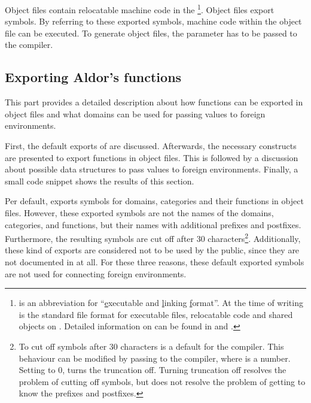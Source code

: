 Object files contain relocatable machine code in the \ELF\footnote{\ELF is an abbreviation for ``{\underline e}xecutable and {\underline l}inking {\underline f}ormat''. At the time of writing \LibCharSet \ELF is the standard file format for executable files, relocatable code and shared objects on \GNULinux. Detailed information on \ELF can be found in \cite{ELF1995} and \cite{SystemV2003}.}. Object files export symbols. By referring to these exported symbols, machine code within the object file can be executed. To generate object files, the parameter  has to be passed to the \Aldor compiler.




\subsection{Exporting Aldor's functions}

This part provides a detailed description about how \Aldor functions can be exported in object files and what domains can be used for passing values to foreign environments.

First, the default exports of \Aldor are discussed. Afterwards, the necessary \Aldor constructs are presented to export \Aldor functions in object files. This is followed by a discussion about possible data structures to pass \Aldor values to foreign environments. Finally, a small code snippet shows the results of this section.

Per default, \Aldor exports symbols for domains, categories and their functions in object files. However, these exported symbols are not the names of the domains, categories, and functions, but their names with additional prefixes and postfixes. Furthermore, the resulting symbols are cut off after 30 characters\footnote{To cut off symbols after $30$ characters is a default for the \Aldor compiler. This behaviour can be modified by passing  to the \Aldor compiler, where  is a number. Setting  to $0$, turns the truncation off. Turning truncation off resolves the problem of cutting off symbols, but does not resolve the problem of getting to know the prefixes and postfixes. }. Additionally, these kind of exports are considered not to be used by the public, since they are not documented in \cite{AldorUG} at all. For these three reasons, these default exported symbols are not used for connecting foreign environments.

